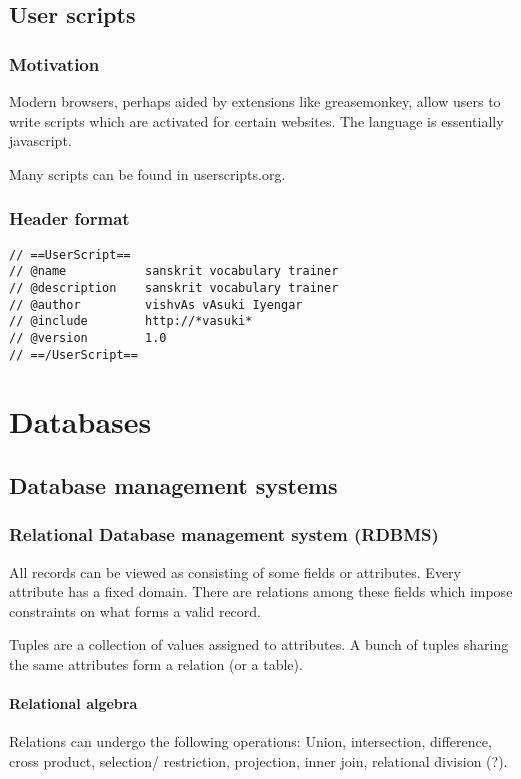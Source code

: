 \documentclass[oneside, article]{memoir}
\begin{document}
\chapter{User scripts}
\section{Motivation}
Modern browsers, perhaps aided by extensions like greasemonkey, allow users to write scripts which are activated for certain websites. The language is essentially javascript.

Many scripts can be found in userscripts.org.

\section{Header format}
\begin{verbatim}
// ==UserScript==
// @name           sanskrit vocabulary trainer
// @description    sanskrit vocabulary trainer
// @author         vishvAs vAsuki Iyengar
// @include        http://*vasuki*
// @version        1.0
// ==/UserScript==
\end{verbatim}



\part{Databases}
\chapter{Database management systems}
\section{Relational Database management system (RDBMS)}
All records can be viewed as consisting of some fields or attributes.  Every attribute has a fixed domain. There are relations among these fields which impose constraints on what forms a valid record.

Tuples are a collection of values assigned to attributes. A bunch of tuples sharing the same attributes form a relation (or a table).

\subsection{Relational algebra}
Relations can undergo the following operations: Union, intersection, difference, cross product, selection/ restriction, projection, inner join, relational division (?).
\end{document}
